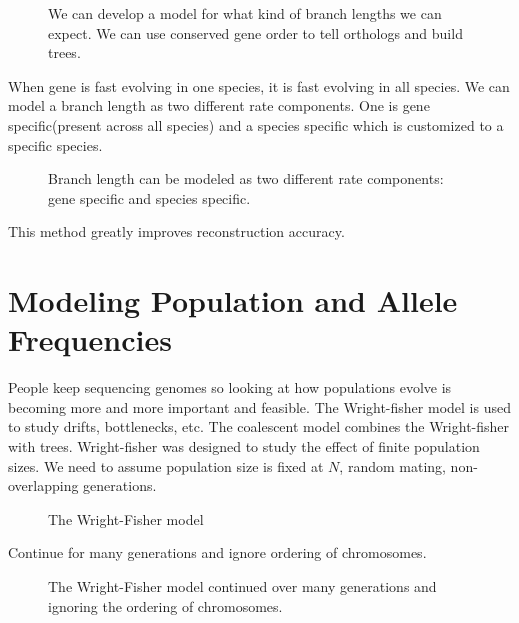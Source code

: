 \begin{figure}[ht!]
  \centering
  \caption{We can develop a model for what kind of branch lengths we
    can expect. We can use conserved gene order to tell orthologs and
    build trees.}
  \label{Fig11_DevelopingRatesModel}
\end{figure}

When gene is fast evolving in one species, it is fast evolving in all
species. We can model a branch length as two different rate
components. One is gene specific(present across all species) and a
species specific which is customized to a specific species.

\begin{figure} [ht!] 
  \centering
  \caption{Branch length can be modeled as two different rate
    components: gene specific and species specific.}
  \label{Fig12_UsingRateModels}
\end{figure} 

\noindent This method greatly improves reconstruction accuracy.

\section{Modeling Population and Allele Frequencies}
People keep sequencing genomes so looking at how populations evolve is
becoming more and more important and feasible. The Wright-fisher model
is used to study drifts, bottlenecks, etc. The coalescent model
combines the Wright-fisher with trees. Wright-fisher was designed to
study the effect of finite population sizes. We need to assume
population size is fixed at $N$, random mating, non-overlapping
generations.

\begin{figure} [ht!] 
  \centering 
  \caption{The Wright-Fisher model}
  \label{Fig13_FisherWrightModel}
\end{figure} 

\noindent Continue for many generations and ignore ordering of chromosomes.

\begin{figure} [ht!] 
  \centering 
  \caption{The Wright-Fisher model continued over many generations and
    ignoring the ordering of chromosomes.}
  \label{Fig14_FisherWrightManyGenerations}
\end{figure} 

